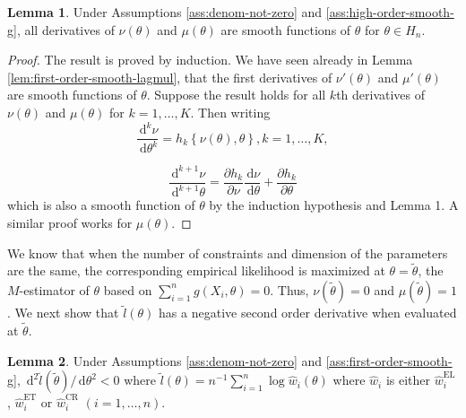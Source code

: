 \documentclass[oneside,english]{amsbook}
\numberwithin{section}{chapter}
\numberwithin{equation}{section}
\numberwithin{figure}{section}
\theoremstyle{plain}
\theoremstyle{plain}
\theoremstyle{definition}
\theoremstyle{plain}
\theoremstyle{plain}
\theoremstyle{remark}
\theoremstyle{definition}
\newtheorem{lemma}{Lemma}
\theoremstyle{definition}
\newcommand{\diff}{\,\mathrm{d}}
\begin{document}
\begin{lemma}
\label{lem:mul-el-smooth-lagrange-mul-1}Under Assumptions \ref{ass:denom-not-zero} and \ref{ass:high-order-smooth-g}, all derivatives of $\nu\left(\theta\right)$
and $\mu\left(\theta\right)$ are smooth functions of $\theta$ for
$\theta\in H_n$.\end{lemma}
\begin{proof}
The result is proved by induction. We have seen already in Lemma \ref{lem:first-order-smooth-lagmul}, that 
the first derivatives of  $\nu'\left(\theta\right)$ and $\mu'\left(\theta\right)$
are smooth functions of $\theta$. Suppose the result holds for all
$k$th derivatives of $\nu\left(\theta\right)$ and $\mu\left(\theta\right)$
for $k=1,\ldots,K$. Then writing 
\[
\frac{\diff^{k}\nu}{\diff\theta^{k}}=h_{k}\left\{ \nu\left(\theta\right),\theta\right\} ,k=1,\ldots,K,
\]
 
\[
\frac{\diff^{k+1}\nu}{\diff^{k+1}\theta}=\frac{\partial h_{k}}{\partial\nu}\frac{\diff\nu}{\diff\theta}+\frac{\partial h_{k}}{\partial\theta}
\]
which is also a smooth function of $\theta$ by the induction hypothesis
and Lemma 1. A similar proof works for $\mu\left(\theta\right)$.
\end{proof}
We know that when the number of constraints and dimension of the parameters
are the same, the corresponding empirical likelihood is maximized
at $\theta=\tilde{\theta}$, the $M$-estimator of $\theta$ based on
$\sum_{i=1}^{n}g\left(X_{i},\theta\right)=0$. Thus, $\nu\left(\tilde{\theta}\right)=0$
and $\mu\left(\tilde{\theta}\right)=1$. We next show that $\tilde{l}\left(\theta\right)$
has a negative second order derivative when evaluated at $\tilde{\theta}$.
\begin{lemma}
\label{lem:bell-shape-el} %
 Under  Assumptions \ref{ass:denom-not-zero} and \ref{ass:first-order-smooth-g},
$\diff^{2}\tilde{l}\left(\tilde{\theta}\right)/\diff\theta^{2}<0$
where $\tilde{l}\left(\theta\right)=n^{-1}\sum_{i=1}^{n}\log\hat{w}_{i}\left(\theta\right)$
where $\hat{w}_{i}$ is either $\hat{w}_{i}^{\mathrm{EL}}$, $\hat{w}_{i}^{\mathrm{ET}}$
or $\hat{w}_{i}^{\mathrm{CR}}$ $\left(i=1,\ldots,n\right)$.\end{lemma}
\end{document}
